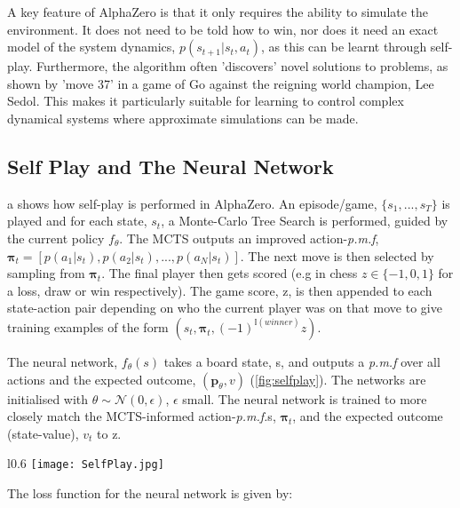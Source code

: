 \documentclass[../main.tex]{subfiles}
\begin{document}
A key feature of AlphaZero is that it only requires the ability to simulate the environment. It does not need to be told how to win, nor does it need an exact model of the system dynamics, $p(s_{t+1} |s_t, a_t)$, as this can be learnt through self-play. Furthermore, the algorithm often 'discovers' novel solutions to problems, as shown by 'move 37' in a game of Go against the reigning world champion, Lee Sedol. This makes it particularly suitable for learning to control complex dynamical systems where approximate simulations can be made.

\subsection{Self Play and The Neural Network}

a
shows how self-play is performed in AlphaZero. An episode/game, $\{s_1, ..., s_T\}$ is played and for each state, $s_t$, a Monte-Carlo Tree Search is performed, guided by the current policy $f_\theta$. The MCTS outputs an improved action-\textit{p.m.f}, $\boldsymbol{\pi}_t = [p(a_1|s_t), p(a_2|s_t), ..., p(a_N|s_t)]$. The next move is then selected by sampling from $\boldsymbol{\pi}_t$. The final player then gets scored (e.g in chess $z \in \{-1, 0, 1\} $ for a loss, draw or win respectively). The game score, z, is then appended to each state-action pair depending on who the current player was on that move to give training examples of the form $(s_t, \boldsymbol{\pi}_t, (-1)^{\mathbb{I}(winner)}z)$. 

The neural network, $f_\theta(s)$ takes a board state, s, and outputs a \textit{p.m.f} over all actions and the expected outcome, $(\boldsymbol{p}_\theta, v)$ (\cref{fig:selfplay}). The networks are initialised with $\theta \sim \mathcal{N}(0, \epsilon)$, $\epsilon$ small. The neural network is trained to more closely match the MCTS-informed action-\textit{p.m.f.}s, $\boldsymbol{\pi}_t$, and the expected outcome (state-value), $v_t$ to z.

\begin{wrapfigure}{l}{0.6\textwidth}
   \centering
   \texttt{[image: SelfPlay.jpg]}
   \caption{A schematic showing how self-play and policy training are performed. Taken from \cite{AlphaGoZero}.}
   \label{fig:selfplay}
   \vspace{0.5cm}
\end{wrapfigure}

The loss function for the neural network is given by:
\end{document}
